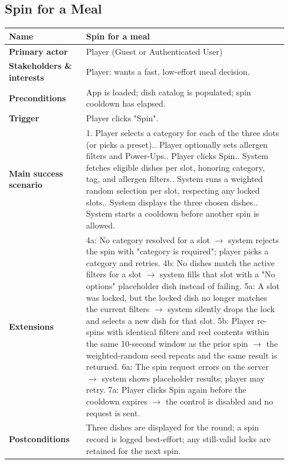 \documentclass[sigconf]{acmart}
\begin{document}
\subsection*{Spin for a Meal}
{\footnotesize
\begin{supertabular}{@{}p{0.26\linewidth}p{0.68\linewidth}@{}}
\textbf{Name} & Spin for a meal \\
\hline
\textbf{Primary actor} & Player (Guest or Authenticated User) \\
\hline
\textbf{Stakeholders \& interests} & Player: wants a fast, low-effort meal decision. \\
\hline
\textbf{Preconditions} & App is loaded; dish catalog is populated; spin cooldown has elapsed. \\
\hline
\textbf{Trigger} & Player clicks "Spin". \\
\hline
\textbf{Main success scenario} & 1. Player selects a category for each of the three slots (or picks a preset).. Player optionally sets allergen filters and Power-Ups.. Player clicks Spin.. System fetches eligible dishes per slot, honoring category, tag, and allergen filters.. System runs a weighted random selection per slot, respecting any locked slots.. System displays the three chosen dishes.. System starts a cooldown before another spin is allowed. \\
\hline
\textbf{Extensions} & 4a: No category resolved for a slot $\rightarrow$ system rejects the spin with "category is required"; player picks a category and retries.\newline
4b: No dishes match the active filters for a slot $\rightarrow$ system fills that slot with a "No options" placeholder dish instead of failing.\newline
5a: A slot was locked, but the locked dish no longer matches the current filters $\rightarrow$ system silently drops the lock and selects a new dish for that slot.\newline
5b: Player re-spins with identical filters and reel contents within the same 10-second window as the prior spin $\rightarrow$ the weighted-random seed repeats and the same result is returned.\newline
6a: The spin request errors on the server $\rightarrow$ system shows placeholder results; player may retry.\newline
7a: Player clicks Spin again before the cooldown expires $\rightarrow$ the control is disabled and no request is sent. \\
\hline
\textbf{Postconditions} & Three dishes are displayed for the round; a spin record is logged best-effort; any still-valid locks are retained for the next spin. \\
\end{supertabular}
}
\end{document}
